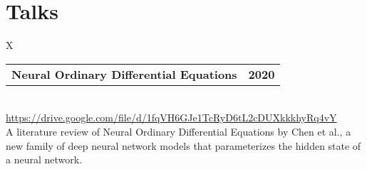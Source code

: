 \documentclass[10pt]{article}
\newcommand{\tabularxwidth}{\textwidth}
\begin{document}

    
        \section{Talks}

    
        \begin{minipage}{\tabularxwidth}
        \begin{tabularx}{\tabularxwidth}{X}
            {
                \begin{tabularx}{\tabularxwidth}{@{}X r}
                    \textbf{Neural Ordinary Differential Equations} &
                    \textbf{
        2020} \\
                \end{tabularx}
            } \\

            

            
                \url{https://drive.google.com/file/d/1fqVH6GJe1TcRyD6tL2cDUXkkkhyRq4vY} \\
            
            

            
    A literature review of Neural Ordinary Differential Equations by Chen et al., a new family of deep neural network models that parameterizes the hidden state of a neural network.
        \end{tabularx}
        
            \vspace{.5em}
        

        \end{minipage}
    
\end{document}
